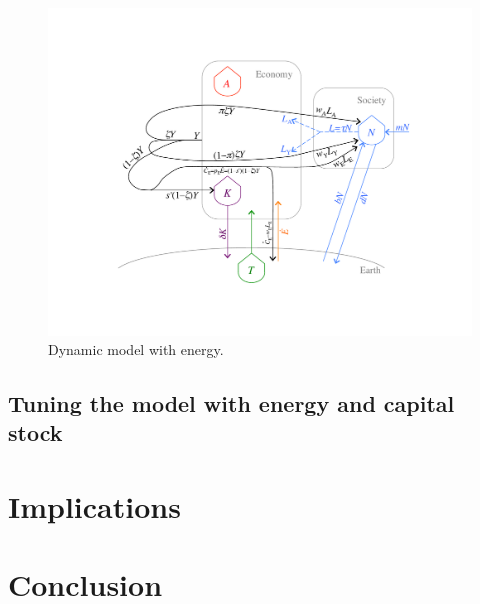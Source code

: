 \documentclass[letterpaper,12pt]{article}
\begin{document}
\begin{figure} \label{fig:ModelWithEnergy}
  \begin{center}
    \includegraphics[width=\textwidth]{figure_other/ModelWithEnergy.pdf}
    \caption{Dynamic model with energy.}
  \end{center}
\end{figure}

\subsection{Tuning the model with energy and capital stock}

\section{Implications}

\section{Conclusion}




\end{document}
